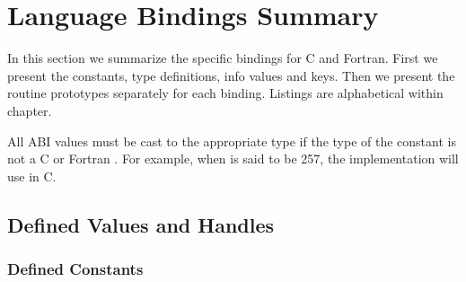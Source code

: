 
 
\chapter{Language Bindings Summary}
\label{sec:lang}
\label{chap:lang}
\label{chap:binding}

In this section we summarize the specific bindings for 
C and Fortran.
First we present the constants, type definitions, info values and keys. Then we present the routine prototypes separately for each binding.
Listings are alphabetical within chapter.

All ABI values must be cast to the appropriate type if the type of the constant
is not a C  or Fortran .
For example, when  is said to be 257,
the implementation will use  in C.
 
\section{Defined  Values and Handles}
\label{sec:lang:const}

\subsection{Defined Constants}
\label{subsec:annexa-const}

